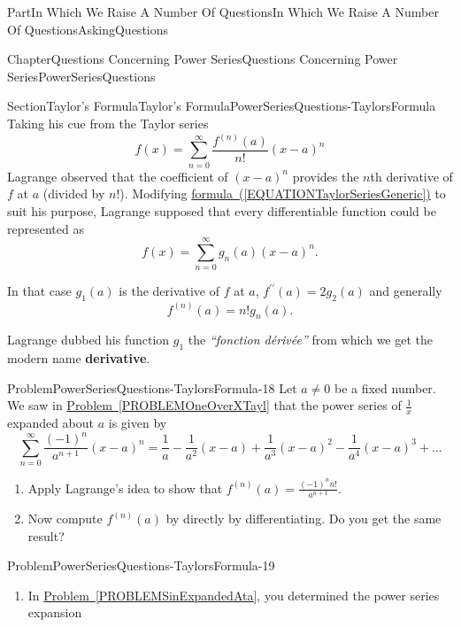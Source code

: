 \documentclass[oneside,10pt,]{book}
\newcommand{\xreffont}{\relax}
\newcommand{\terminology}[1]{\textbf{#1}}
\numberwithin{equation}{part}
\begin{document}
\begin{partptx}{Part}{In Which We Raise A Number Of Questions}{}{In Which We Raise A Number Of Questions}{}{}{AskingQuestions}
\begin{chapterptx}{Chapter}{Questions Concerning Power Series}{}{Questions Concerning Power Series}{}{}{PowerSeriesQuestions}
\begin{sectionptx}{Section}{Taylor's Formula}{}{Taylor's Formula}{}{}{PowerSeriesQuestions-TaylorsFormula}
Taking his cue from the Taylor series%
\begin{equation}
f(x) = \sum_{n=0}^\infty\frac{f^{(n)}(a)}{n!}(x-a)^n\label{EQUATIONTaylorSeriesGeneric}
\end{equation}
Lagrange observed that the coefficient of \((x-a)^n\) provides the \(n\)th derivative of \(f\) at \(a\) (divided by \(n!\)). Modifying \hyperref[EQUATIONTaylorSeriesGeneric]{formula~({\xreffont\ref{EQUATIONTaylorSeriesGeneric}})} to suit his purpose, Lagrange supposed that every differentiable function could be represented as%
\begin{equation*}
f(x) = \sum_{n=0}^\infty g_n(a)(x-a)^n\text{.}
\end{equation*}
%
\par
In that case \(g_1(a)\) is the derivative of \(f\) at \(a\), \(f^{\prime\prime}(a)=2g_2(a)\) and generally%
\begin{equation*}
f^{(n)}(a)=n! g_n(a)\text{.}
\end{equation*}
%
\par
Lagrange dubbed his function \(g_1\) the \textit{``fonction dérivée''} from which we get the modern name \terminology{derivative}.%
\begin{problem}{Problem}{}{PowerSeriesQuestions-TaylorsFormula-18}%
Let \(a\neq 0\) be a fixed number. We saw in \hyperref[PROBLEMOneOverXTayl]{Problem~{\xreffont\ref{PROBLEMOneOverXTayl}}}  that the power series of \(\frac{1}{x}\) expanded about \(a\) is given by%
\begin{equation*}
\sum^{\infty}_{n=0}{\frac{{\left(-1\right)}^n}{a^{n+1}}{\left(x-a\right)}^n}
=\frac{1}{a}-\frac{1}{a^2}\left(x-a\right)
+\frac{1}{a^3}{\left(x-a\right)}^2
-\frac{1}{a^4}{\left(x-a\right)}^3+\dots
\end{equation*}
%
\begin{enumerate}[font=\bfseries,label=(\alph*),ref=\alph*]%
\item{}Apply Lagrange's idea to show that \(f^{\left(n\right)}\left(a\right)=\frac{{\left(-1\right)}^nn!}{a^{n+1}}\).%
\item{}Now compute \(f^{\left(n\right)}\left(a\right)\) by directly by differentiating.  Do you get the same result?%
\end{enumerate}%
\end{problem}
\begin{problem}{Problem}{}{PowerSeriesQuestions-TaylorsFormula-19}%
\begin{enumerate}[font=\bfseries,label=(\alph*),ref=\alph*]%
\item{}In \hyperref[PROBLEMSinExpandedAta]{Problem~{\xreffont\ref{PROBLEMSinExpandedAta}}}, you determined the power series expansion%

\end{enumerate}
\end{problem}
\end{sectionptx}
\end{chapterptx}
\end{partptx}
\end{document}
